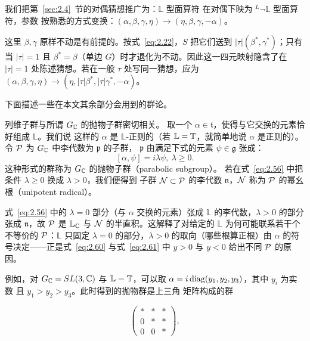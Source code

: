 我们把第~\ref{sec:2.4}~节的对偶猜想推广为：$\mathbb{L}$ 型面算符
在对偶下映为 $^L\neg \mathbb{L}$ 型面算符，参数
按熟悉的方式变换：$(\alpha,\beta,\gamma,\eta)\to(\eta,\beta,\gamma,-\alpha)$。

\begin{yizhu}[易错点]
这里 $\beta,\gamma$ 原样不动是有前提的。按式~\eqref{eq:2.22}，$S$ 把它们送到 $|\tau|(\beta^*,\gamma^*)$；只有当 $|\tau|=1$ 且 $\beta^*=\beta$（单边 $G$）时才退化为不动。因此这一四元映射隐含了在 $|\tau|=1$ 处陈述猜想。若在一般 $\tau$ 处写同一猜想，应为 $(\alpha,\beta,\gamma,\eta)\to(\eta,|\tau|\beta^*,|\tau|\gamma^*,-\alpha)$。
\end{yizhu}


\bigskip{}

下面描述一些在本文其余部分会用到的群论。

列维子群与所谓 $G_{\mathbb{C}}$ 的抛物子群密切相关。
取一个 $\alpha\in \mathfrak t$，使得与它交换的元素恰好组成 $\mathbb{L}$。我们说
这样的 $\alpha$ 是 $\mathbb{L}$-正则的（若 $\mathbb{L}={\mathbb{T}}$，就简单地说 $\alpha$ 是正则的）。
令 $\mathcal{P}$ 为 $G_{\mathbb{C}}$ 中李代数为 $\mathfrak p$ 的子群，
$\mathfrak p$ 由满足下式的元素 $\psi\in \mathfrak g$ 张成：
\setcounter{equation}{55}
\begin{equation}\label{eq:2.56}
  [\alpha,\psi]=i\lambda\psi,
~\lambda\geq 0.
\end{equation}
  这种形式的群称为 $G_{\mathbb{C}}$ 的抛物子群（parabolic subgroup）。
若在式~\eqref{eq:2.56} 中把条件 $\lambda\geq 0$ 换成 $\lambda>0$，我们便得到
子群 $\mathcal{N}\subset \mathcal{P}$ 的李代数
$\mathfrak n$，$\mathcal{N}$ 称为 $\mathcal{P}$ 的幂幺根（unipotent radical）。

\begin{yizhu}[含糊点拨]
式~\eqref{eq:2.56} 中的 $\lambda=0$ 部分（与 $\alpha$ 交换的元素）张成 $\mathbb{L}$ 的李代数，$\lambda>0$ 的部分张成 $\mathfrak n$，故 $\mathcal{P}$ 是 $\mathbb{L}_{\mathbb{C}}$ 与 $\mathcal{N}$ 的半直积。这解释了对给定的 $\mathbb{L}$ 为何可能联系若干个不等价的 $\mathcal{P}$：$\mathbb{L}$ 只固定 $\lambda=0$ 的部分，$\lambda>0$ 的取向（哪些根算正根）由 $\alpha$ 的符号决定——正是式~\eqref{eq:2.60} 与式~\eqref{eq:2.61} 中 $y>0$ 与 $y<0$ 给出不同 $\mathcal{P}$ 的原因。
\end{yizhu}



例如，对 $G_{\mathbb{C}}=SL(3,{\mathbb{C}})$ 与
$\mathbb{L}={\mathbb{T}}$，可以取 $\alpha=i\,{\rm diag}(y_1,y_2,y_3)$，其中 $y_i$ 为实数
且 $y_1>y_2>y_3$。此时得到的抛物群是上三角
矩阵构成的群

\setcounter{equation}{56}
\begin{equation}\label{eq:2.57}
  \left(\begin{matrix}*&*&*\\ 0&*&*\\ 0&0&*\end{matrix}\right),
\end{equation}

